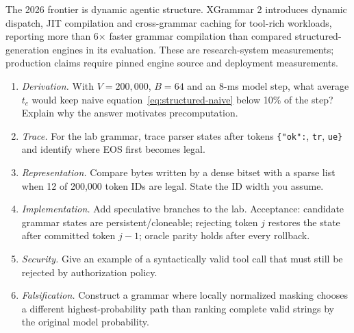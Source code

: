 The 2026 frontier is dynamic agentic structure. XGrammar 2 introduces dynamic dispatch,
JIT compilation and cross-grammar caching for tool-rich workloads, reporting more than
6$\times$ faster grammar compilation than compared structured-generation
engines in its evaluation.
These are research-system measurements; production claims require pinned engine source
and deployment measurements.

\ExercisesSection
\begin{enumerate}
\item \emph{Derivation.} With $V=200{,}000$, $B=64$ and an 8-ms model step, what
average $t_c$ would keep naive equation~\eqref{eq:structured-naive} below 10\% of the
step? Explain why the answer motivates precomputation.
\item \emph{Trace.} For the lab grammar, trace parser states after tokens
\texttt{\{"ok":}, \texttt{tr}, \texttt{ue\}} and identify where EOS first becomes
legal.
\item \emph{Representation.} Compare bytes written by a dense bitset with a sparse
list when 12 of 200,000 token IDs are legal. State the ID width you assume.
\item \emph{Implementation.} Add speculative branches to the lab. Acceptance:
candidate grammar states are persistent/cloneable; rejecting token $j$ restores the
state after committed token $j-1$; oracle parity holds after every rollback.
\item \emph{Security.} Give an example of a syntactically valid tool call that must
still be rejected by authorization policy.
\item \emph{Falsification.} Construct a grammar where locally normalized masking
chooses a different highest-probability path than ranking complete valid strings by
the original model probability.
\end{enumerate}


